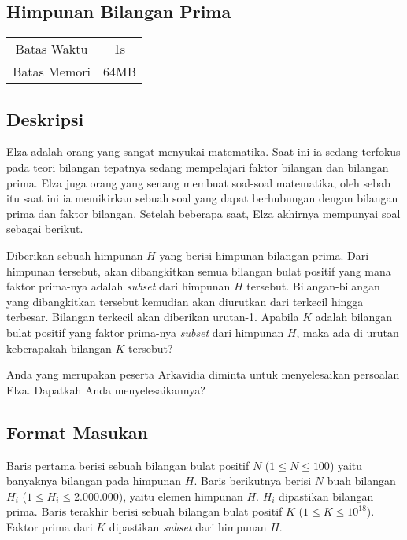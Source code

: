 \documentclass{article}
\begin{document}
\begin{center}
    \section*{Himpunan Bilangan Prima} %

    \begin{tabular}{ | c c | }
        \hline
        Batas Waktu  & 1s \\    %
        Batas Memori & 64MB \\  %
        \hline
    \end{tabular}
\end{center}

\subsection*{Deskripsi}

Elza adalah orang yang sangat menyukai matematika. Saat ini ia sedang terfokus pada teori bilangan tepatnya 
sedang mempelajari faktor bilangan dan bilangan prima. Elza juga orang yang senang membuat soal-soal matematika, 
oleh sebab itu saat ini ia memikirkan sebuah soal yang dapat berhubungan dengan bilangan prima dan faktor bilangan. 
Setelah beberapa saat, Elza akhirnya mempunyai soal sebagai berikut.

Diberikan sebuah himpunan $H$ yang berisi himpunan bilangan prima. Dari himpunan tersebut, akan dibangkitkan 
semua bilangan bulat positif yang mana faktor prima-nya adalah \textit{subset} dari himpunan $H$ tersebut. 
Bilangan-bilangan yang dibangkitkan tersebut kemudian akan diurutkan dari terkecil hingga terbesar. Bilangan 
terkecil akan diberikan urutan-1. Apabila $K$ adalah bilangan bulat positif yang faktor prima-nya \textit{subset}
dari himpunan $H$, maka ada di urutan keberapakah bilangan $K$ tersebut?

Anda yang merupakan peserta Arkavidia diminta untuk menyelesaikan persoalan Elza. Dapatkah Anda menyelesaikannya?

\subsection*{Format Masukan}
Baris pertama berisi sebuah bilangan bulat positif $N$ ($1 \leq N \leq 100$) yaitu banyaknya bilangan pada
himpunan $H$. Baris berikutnya berisi $N$ buah bilangan $H_i$ ($1 \leq H_i \leq 2.000.000$), yaitu elemen himpunan $H$. $H_i$ dipastikan
bilangan prima. Baris terakhir berisi sebuah bilangan bulat positif $K$ ($1 \leq K \leq 10^{18}$). Faktor prima dari $K$ dipastikan
\textit{subset} dari himpunan $H$.
\end{document}
